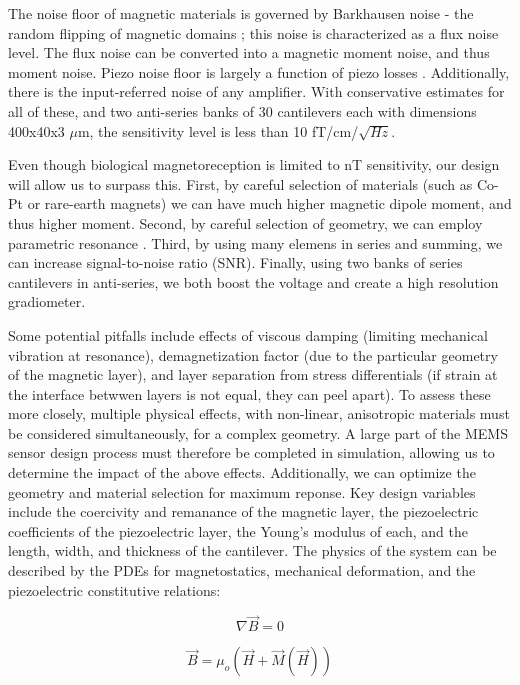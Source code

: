 The noise floor of magnetic materials is governed by Barkhausen noise - the random flipping of magnetic domains \cite{butta2012sources}; this noise is characterized as a flux noise level. The flux noise can be converted into a magnetic moment noise, and thus moment noise. Piezo noise floor is largely a function of piezo losses \cite{levinzon2004fundamental}. Additionally, there is the input-referred noise of any amplifier. With conservative estimates for all of these, and two anti-series banks of 30 cantilevers each with dimensions 400x40x3 $\mu$m, the sensitivity level is less than 10 fT/cm/$\sqrt{Hz}$.

 Even though biological magnetoreception is limited to nT sensitivity, our design will allow us to surpass this. First, by careful selection of materials (such as Co-Pt or rare-earth magnets) \cite{coey2010magnetism, arnold2009permanent} we can have much higher magnetic dipole moment, and thus higher moment. Second, by careful selection of geometry, we can employ parametric resonance \cite{van2006resonant}. Third, by using many elemens in series and summing, we can increase signal-to-noise ratio (SNR). Finally, using two banks of series cantilevers in anti-series, we both boost the voltage and create a high resolution gradiometer.

 Some potential pitfalls include effects of viscous damping (limiting mechanical vibration at resonance), demagnetization factor (due to the particular geometry of the magnetic layer), and layer separation from stress differentials (if strain at the interface betwwen layers is not equal, they can peel apart). To assess these more closely, multiple physical effects, with non-linear, anisotropic materials must be considered simultaneously, for a complex geometry. A large part of the MEMS sensor design process must therefore be completed in simulation, allowing us to determine the impact of the above effects. Additionally, we can optimize the geometry and material selection for maximum reponse. Key design variables include the coercivity and remanance of the magnetic layer, the piezoelectric coefficients of the piezoelectric layer, the Young's modulus of each, and the length, width, and thickness of the cantilever. The physics of the system can be described by the PDEs for magnetostatics, mechanical deformation, and the piezoelectric constitutive relations:

 $$ \nabla \vec{B} = 0$$

 $$ \vec{B} = \mu_o(\vec{H}+\vec{M}(\vec{H}))$$

